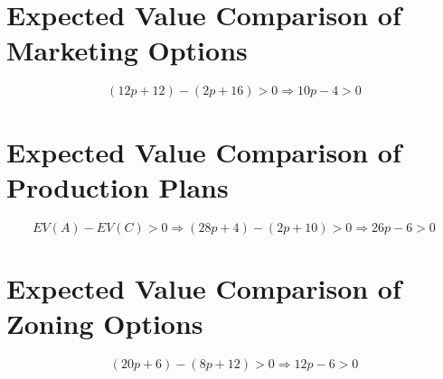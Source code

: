 \section*{Expected Value Comparison of Marketing Options}
\[(12p+12)-(2p+16)>0 \Rightarrow 10p-4>0\]

\section*{Expected Value Comparison of Production Plans}
\[EV(A)-EV(C)>0 \Rightarrow (28p+4)-(2p+10)>0 \Rightarrow 26p-6>0\]

\section*{Expected Value Comparison of Zoning Options}
\[(20p+6)-(8p+12)>0 \Rightarrow 12p-6>0\]


